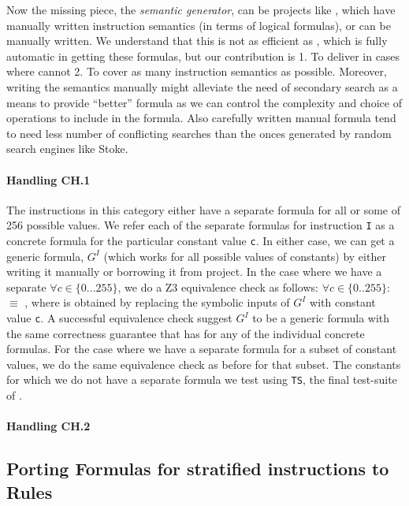    Now the missing piece, the  \emph{semantic generator}, can be  projects like
   \Stoke, which have manually written instruction semantics (in terms of
       logical formulas), or can be manually written.  We understand that this
   is not as efficient as \Stoke, which is fully automatic in getting these
   formulas, but our contribution is 1. To deliver in cases where \Stoke cannot
   2. To cover  as many instruction semantics as possible. Moreover, writing the
   semantics manually might alleviate the need of secondary search as a means to
   provide ``better'' formula as we can control the complexity and choice of
   operations to include in the formula. Also carefully written manual formula
   tend to need less number of conflicting searches than the onces generated by
   random search engines like Stoke.
   
   \paragraph{Handling CH.1} The instructions in this category either  have a
   separate formula for all or some of 256 possible values. We refer each of the
   separate formulas for instruction {\tt I} as a concrete formula  for
   the particular constant value {\tt c}.  In either case, we can get a generic
   formula, $G^I$ (which works for all possible values of constants)  by either
   writing it manually or borrowing it from  \Stoke project. In the case where
   we have a separate  $\forall c \in \{0...255\}$, we do a Z3
   equivalence check as follows: $\forall c \in \{0..255\}:$  $\equiv$
   , where  is obtained by replacing the symbolic inputs of
   $G^I$ with constant value {\tt c}. A successful equivalence check suggest
   $G^I$ to be a generic formula with the same correctness guarantee that
   \Strata has for any of the individual concrete formulas. For the case where
   we have a separate formula for a subset of constant values, we do the same
   equivalence check as before for that subset. The constants for which we do
   not have a separate formula we test  using {\tt TS}, the final
   test-suite of \Strata.  
    
   \paragraph{Handling CH.2}
     
   
  

\subsection{Porting Formulas for stratified instructions to \K Rules}

